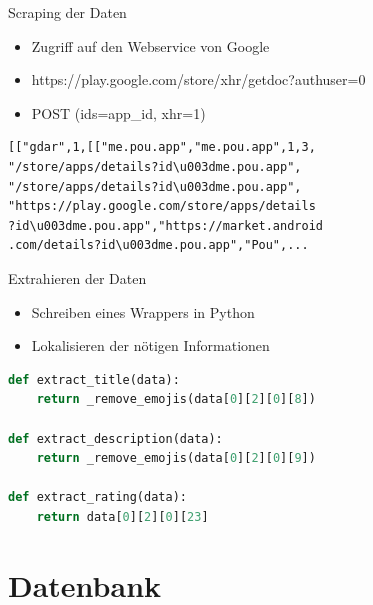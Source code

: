 \documentclass[compress,t]{beamer}
\begin{document}
\begin{frame}[fragile]{Scraping der Daten}

    \begin{itemize}
        \item Zugriff auf den Webservice von Google
        \item https://play.google.com/store/xhr/getdoc?authuser=0
        \item POST (ids=app\_id, xhr=1)
    \end{itemize}

    \begin{lstlisting}
[["gdar",1,[["me.pou.app","me.pou.app",1,3,
"/store/apps/details?id\u003dme.pou.app",
"/store/apps/details?id\u003dme.pou.app",
"https://play.google.com/store/apps/details
?id\u003dme.pou.app","https://market.android
.com/details?id\u003dme.pou.app","Pou",...
    \end{lstlisting}

\end{frame}

\begin{frame}[fragile]{Extrahieren der Daten}
    \begin{itemize}
        \item Schreiben eines Wrappers in Python
        \item Lokalisieren der nötigen Informationen
    \end{itemize}

    \begin{lstlisting}[language=Python]
def extract_title(data):
    return _remove_emojis(data[0][2][0][8])

def extract_description(data):
    return _remove_emojis(data[0][2][0][9])

def extract_rating(data):
    return data[0][2][0][23]
    \end{lstlisting}

\end{frame}

\section{Datenbank}
\end{document}
